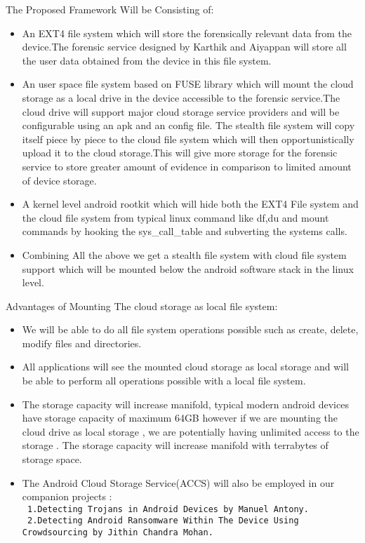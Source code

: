 The Proposed Framework Will be Consisting of:\\
\begin{itemize}
\item An EXT4 file system which will store the forensically relevant data from the device.The forensic service designed by  Karthik \cite{Karthik2016} and Aiyappan \cite{Aiyyappan2015} will store all the user data obtained from the device in this file system.

\item An user space file system based on FUSE library which will mount the cloud storage as a local drive in the device accessible to the forensic service.The cloud drive will support major cloud storage service providers and will be configurable using an apk and an config file. The stealth file system will copy itself piece by piece to the cloud file system which will then opportunistically upload it to the cloud storage.This will give more storage for the forensic service to store greater amount of evidence in comparison to limited amount of device storage.

\item A kernel level android rootkit which will hide both the EXT4 File system and the cloud file system from typical linux command like df,du and mount commands by hooking the sys\_call\_table and subverting the systems calls.

\item Combining All the above we get a stealth file system with cloud file system support which will be mounted below the android software stack in the linux level.
 
\end{itemize}
\bigskip

Advantages of Mounting The cloud storage as local file system:
\begin{itemize}
\item We will be able to do all file system operations possible such as create, delete, modify files and directories.
\item All applications will see the mounted cloud storage as local storage and will be able to perform all operations possible with a local file system.
\item The storage capacity will increase manifold, typical modern android devices have storage capacity of maximum 64GB however if we are mounting the cloud drive as local storage , we are potentially having unlimited access to the storage . The storage capacity will increase manifold with terrabytes of storage space.
\item The Android Cloud Storage Service(ACCS) will also be employed in our companion projects :\\
\tt 
1.Detecting Trojans in Android Devices by Manuel Antony.\\
\tt 
2.Detecting  Android Ransomware Within The
Device Using Crowdsourcing by Jithin Chandra Mohan.
\end{itemize}







